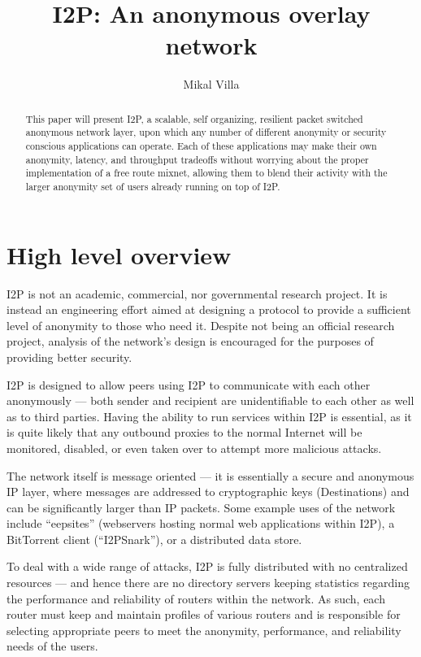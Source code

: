 \documentclass[a4paper,twocolumn,12pt]{article}
\title{I2P: An anonymous overlay network}
\author{Mikal Villa}
\begin{document}
\maketitle

\begin{abstract}\noindent
This paper will present I2P, a scalable, self organizing, resilient packet
switched anonymous network layer, upon which any number of different
anonymity or security conscious applications can operate. Each of these
applications may make their own anonymity, latency, and throughput tradeoffs
without worrying about the proper implementation of a free route mixnet,
allowing them to blend their activity with the larger anonymity set of users
already running on top of I2P.
\end{abstract}

\tableofcontents

\section{High level overview}
I2P is not an academic, commercial, nor governmental research project. It is 
instead an engineering effort aimed at designing a protocol to provide a 
sufficient level of anonymity to those who need it. Despite not being an 
official research project, analysis of the network's design is encouraged for 
the purposes of providing better security.

I2P is designed to allow peers using I2P to communicate with each other
anonymously --- both sender and recipient are unidentifiable to each other
as well as to third parties. Having the ability to run services within I2P
is essential, as it is quite likely that any outbound proxies to the normal
Internet will be monitored, disabled, or even taken over to attempt more
malicious attacks.

The network itself is message oriented --- it is essentially a secure and anonymous
IP layer, where messages are addressed to cryptographic keys (Destinations) and can
be significantly larger than IP packets. Some example uses of the network include
``eepsites'' (webservers hosting normal web applications within I2P), a BitTorrent
client (``I2PSnark''), or a distributed data store.

To deal with a wide range of attacks, I2P is fully distributed with no centralized
resources --- and hence there are no directory servers keeping statistics regarding
the performance and reliability of routers within the network. As such, each router
must keep and maintain profiles of various routers and is responsible for selecting
appropriate peers to meet the anonymity, performance, and reliability needs of the users.
\end{document}
